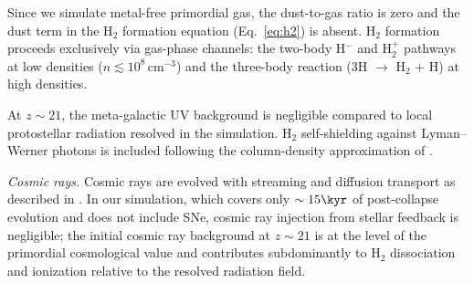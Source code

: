 Since we simulate metal-free primordial gas, the dust-to-gas ratio
is zero and the dust term in the H$_2$ formation equation
(Eq.~\ref{eq:h2}) is absent.
H$_2$ formation proceeds exclusively via gas-phase channels:
the two-body H$^{-}$ and H$_2^+$ pathways at low densities
($n \lesssim 10^8\,\mathrm{cm}^{-3}$) and the three-body
reaction (3H $\to$ H$_2$ + H) at high densities.



At $z \sim 21$, the meta-galactic UV background
\citep{Faucher-Giguère_2019} is negligible compared to local
protostellar radiation resolved in the simulation.
H$_2$ self-shielding against Lyman--Werner photons is included
following the column-density approximation of
.



\textit{Cosmic rays.}
Cosmic rays are evolved with streaming and diffusion transport
as described in \citet{FIRE_3_Updated_Hopkin}.
In our simulation, which covers only $\sim 15\kyr$ of post-collapse
evolution and does not include SNe, cosmic ray injection from
stellar feedback is negligible; the initial cosmic ray background
at $z \sim 21$ is at the level of the primordial cosmological value
and contributes subdominantly to H$_2$ dissociation and ionization
relative to the resolved radiation field.


